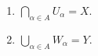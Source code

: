 \documentclass{article}
\newcommand{\dis}{\displaystyle}
\begin{document}
\begin{enumerate}
	\item \(\dis\bigcap_{\alpha \in A} U_ \alpha = X.\)
	\item \(\dis\bigcup_{\alpha \in A} W_ \alpha = Y.\)
\end{enumerate}
\end{document}
